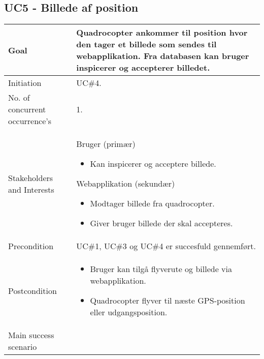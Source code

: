 \subsection*{UC5 - Billede af position}

\begin{table}[H]
\begin{tabular}{|l|p{10cm}|}
\hline

Goal	 								& Quadrocopter ankommer til position hvor den tager et billede som sendes til
webapplikation. Fra databasen kan bruger inspicerer og accepterer billedet. \\\hline
Initiation 							& UC\#4. \\\hline
No. of concurrent occurrence’s		& 1. \\\hline
Stakeholders	and Interests			& Bruger (primær) 
										\begin{itemize}
											\item Kan inspicerer og acceptere billede.
										\end{itemize} 
									  Webapplikation (sekundær)
										\begin{itemize}
											\item Modtager billede fra quadrocopter.
											\item Giver bruger billede der skal accepteres.
										\end{itemize} \\\hline
Precondition							& UC\#1, UC\#3 og UC\#4 er succesfuld gennemført. \\\hline
Postcondition						& 	\begin{itemize}
											\item Bruger kan tilgå flyverute og billede via webapplikation.
											\item Quadrocopter flyver til næste GPS-position eller udgangsposition.
										\end{itemize} \\\hline
Main success scenario				&
 
									\renewcommand{\labelenumi}{\arabic{enumi}.}
									\renewcommand{\labelenumii}{\Roman{enumii}:}


\end{tabular}
\end{table}
